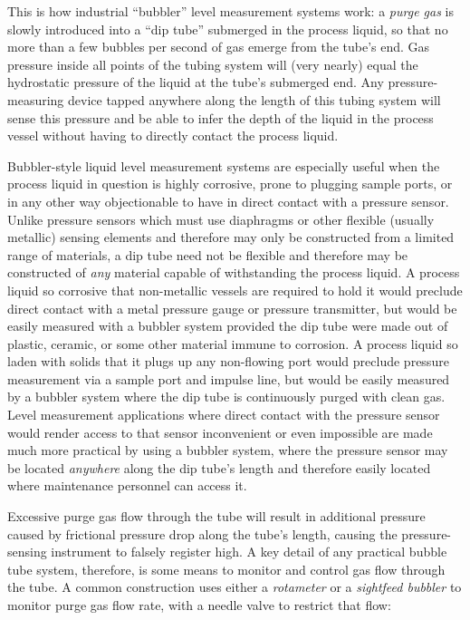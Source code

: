 This is how industrial ``bubbler'' level measurement systems work: a \textit{purge gas} is slowly introduced into a ``dip tube'' submerged in the process liquid, so that no more than a few bubbles per second of gas emerge from the tube's end.  Gas pressure inside all points of the tubing system will (very nearly) equal the hydrostatic pressure of the liquid at the tube's submerged end.  Any pressure-measuring device tapped anywhere along the length of this tubing system will sense this pressure and be able to infer the depth of the liquid in the process vessel without having to directly contact the process liquid.

Bubbler-style liquid level measurement systems are especially useful when the process liquid in question is highly corrosive, prone to plugging sample ports, or in any other way objectionable to have in direct contact with a pressure sensor.  Unlike pressure sensors which must use diaphragms or other flexible (usually metallic) sensing elements and therefore may only be constructed from a limited range of materials, a dip tube need not be flexible and therefore may be constructed of \textit{any} material capable of withstanding the process liquid.  A process liquid so corrosive that non-metallic vessels are required to hold it would preclude direct contact with a metal pressure gauge or pressure transmitter, but would be easily measured with a bubbler system provided the dip tube were made out of plastic, ceramic, or some other material immune to corrosion.  A process liquid so laden with solids that it plugs up any non-flowing port would preclude pressure measurement via a sample port and impulse line, but would be easily measured by a bubbler system where the dip tube is continuously purged with clean gas.  Level measurement applications where direct contact with the pressure sensor would render access to that sensor inconvenient or even impossible are made much more practical by using a bubbler system, where the pressure sensor may be located \textit{anywhere} along the dip tube's length and therefore easily located where maintenance personnel can access it.

\filbreak

Excessive purge gas flow through the tube will result in additional pressure caused by frictional pressure drop along the tube's length, causing the pressure-sensing instrument to falsely register high.  A key detail of any practical bubble tube system, therefore, is some means to monitor and control gas flow through the tube.  A common construction uses either a \textit{rotameter} or a \textit{sightfeed bubbler} to monitor purge gas flow rate, with a needle valve to restrict that flow:     

